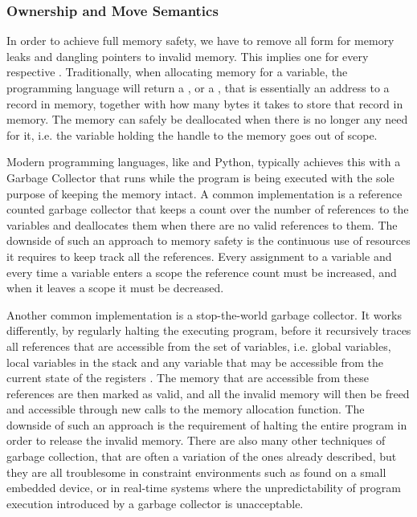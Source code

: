 \subsubsection{Ownership and Move Semantics}
\label{sec:back:rust:own}

In order to achieve full memory safety, we have to remove all form for memory leaks and dangling pointers to invalid memory.
This implies one  for every respective .
Traditionally, when allocating memory for a variable, the programming language will return a ,  or a , that is essentially an address to a record in memory, together with how many bytes it takes to store that record in memory.
The memory can safely be deallocated when there is no longer any need for it, i.e. the variable holding the handle to the memory goes out of scope.

Modern programming languages, like {\Java} and Python, typically achieves this with a Garbage Collector that runs while the program is being executed with the sole purpose of keeping the memory intact.
A common implementation is a reference counted garbage collector that keeps a count over the number of references to the variables and deallocates them when there are no valid references to them.
The downside of such an approach to memory safety is the continuous use of resources it requires to keep track all the references.
Every assignment to a variable and every time a variable enters a scope the reference count must be increased, and when it leaves a scope it must be decreased.

Another common implementation is a stop-the-world garbage collector.
It works differently, by regularly halting the executing program, before it recursively traces all references that are accessible from the  set of variables, i.e. global variables, local variables in the stack and any variable that may be accessible from the current state of the registers \cite{Wilson1992}.
The memory that are accessible from these references are then marked as valid, and all the invalid memory will then be freed and accessible through new calls to the memory allocation function.
The downside of such an approach is the requirement of halting the entire program in order to release the invalid memory.
There are also many other techniques of garbage collection, that are often a variation of the ones already described, but they are all troublesome in constraint environments such as found on a small embedded device, or in real-time systems where the unpredictability of program execution introduced by a garbage collector is unacceptable.

